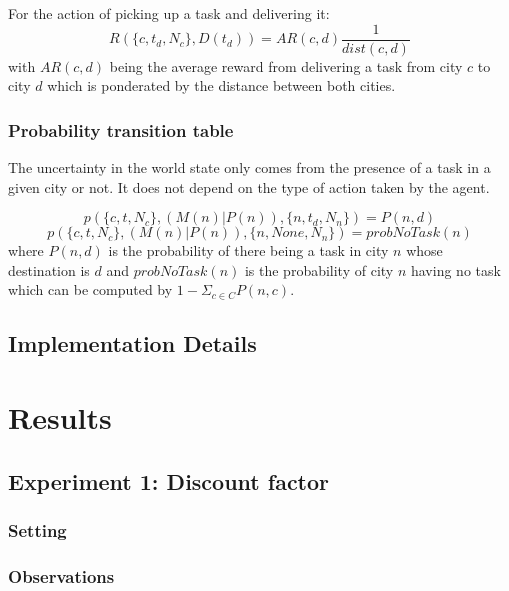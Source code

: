 \documentclass[11pt]{article}
\begin{document}
For the action of picking up a task and delivering it:
$$R(\{c, t_d, N_c\}, D(t_d)) = AR(c, d) \frac{1}{dist(c, d)}$$
with $AR(c, d)$ being the average reward from delivering a task from city
$c$ to city $d$ which is ponderated by the distance between both cities.

\subsubsection{Probability transition table}
The uncertainty in the world state only comes from the presence of a task in a
given city or not. It does not depend on the type of action taken by the agent.

$$ p(\{c, t, N_c\}, (M(n)|P(n)), \{n, t_d, N_n\}) = P(n,d)$$
$$ p(\{c, t, N_c\}, (M(n)|P(n)), \{n, None, N_n\}) = probNoTask(n)$$
where $P(n,d)$ is the probability of there being a task in city $n$ whose
destination is $d$ and $probNoTask(n)$ is the probability of city $n$ having no
task which can be computed by $1 - \Sigma_{c \in C} P(n, c)$.

\subsection{Implementation Details}

\section{Results}

\subsection{Experiment 1: Discount factor}

\subsubsection{Setting}

\subsubsection{Observations}
\end{document}

